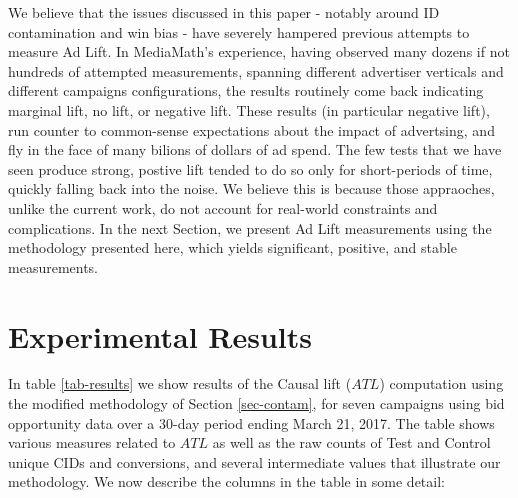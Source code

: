 \documentclass[11pt,a4paper]{article}
\theoremstyle{definition}
\theoremstyle{remark}
\theoremstyle{definition}
\theoremstyle{definition}
\theoremstyle{definition}
\theoremstyle{definition}
\theoremstyle{definition}
\theoremstyle{definition}
\begin{document}
We believe that the issues discussed in this paper - notably around ID contamination and win bias - have severely hampered previous attempts to measure Ad Lift. In MediaMath's experience, having observed many dozens if not hundreds of attempted measurements, spanning different advertiser verticals and different campaigns configurations, the results routinely come back indicating marginal lift, no lift, or negative lift. These results (in particular negative lift), run counter to common-sense expectations about the impact of advertsing, and fly in the face of many bilions of dollars of ad spend. The few tests that we have seen produce strong, postive lift tended to do so only for short-periods of time, quickly falling back into the noise. We believe this is because those appraoches, unlike the current work, do not account for real-world constraints and complications. In the next Section, we present Ad Lift measurements using the methodology presented here, which yields significant, positive, and stable measurements.

\section{Experimental Results} \label{sec-results}

In table \ref{tab-results} we show results of the Causal lift ($ATL$) computation using the modified methodology of Section \ref{sec-contam}, for seven campaigns using bid opportunity data over a 30-day period ending March 21, 2017. 
The table shows various measures related to $ATL$ as well as the raw counts of Test and Control unique CIDs and conversions, and several intermediate values that illustrate our methodology. 
We now describe the columns in the table in some detail:
\end{document}

